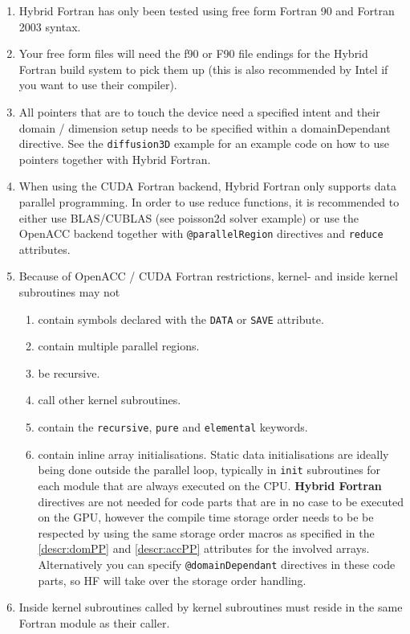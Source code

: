 \begin{enumerate}
 \item Hybrid Fortran has only been tested using free form Fortran 90 and Fortran 2003 syntax.
 \item Your free form files will need the f90 or F90 file endings for the Hybrid Fortran build system to pick them up (this is also recommended by Intel if you want to use their compiler).
 \item All pointers that are to touch the device need a specified intent and their domain / dimension setup needs to be specified within a domainDependant directive. See the \verb|diffusion3D| example for an example code on how to use pointers together with Hybrid Fortran.
 \item When using the CUDA Fortran backend, Hybrid Fortran only supports data parallel programming. In order to use reduce functions, it is recommended to either use BLAS/CUBLAS (see poisson2d solver example) or use the OpenACC backend together with \verb|@parallelRegion| directives and \verb|reduce| attributes.
 \item Because of OpenACC / CUDA Fortran restrictions, kernel- and inside kernel subroutines may not
  \begin{enumerate}
   \item contain symbols declared with the \verb|DATA| or \verb|SAVE| attribute.
   \item contain multiple parallel regions.
   \item be recursive.
   \item call other kernel subroutines.
   \item contain the \verb|recursive|, \verb|pure| and \verb|elemental| keywords.
   \item contain inline array initialisations. Static data initialisations are ideally being done outside the parallel loop, typically in \verb|init| subroutines for each module that are always executed on the CPU. \textbf{Hybrid Fortran} directives are not needed for code parts that are in no case to be executed on the GPU, however the compile time storage order needs to be be respected by using the same storage order macros as specified in the \ref{descr:domPP} and \ref{descr:accPP} attributes for the involved arrays. Alternatively you can specify \verb|@domainDependant| directives in these code parts, so HF will take over the storage order handling.
  \end{enumerate}
 \item Inside kernel subroutines called by kernel subroutines must reside in the same Fortran module as their caller.

\end{enumerate}

